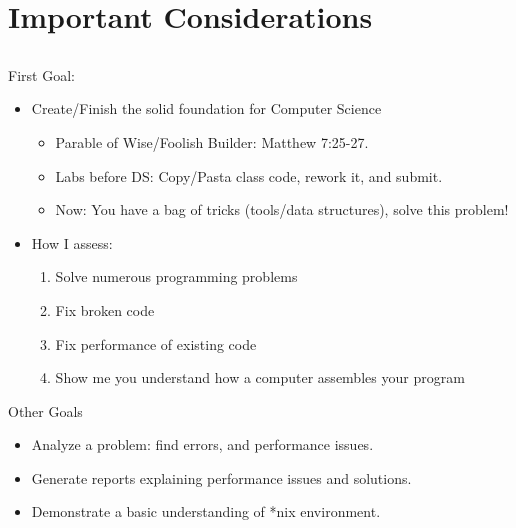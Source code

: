 \documentclass{beamer}
\begin{document}
\section{Important Considerations}
\subsection{}
\begin{frame}{First Goal:}
\begin{itemize}
\item Create/Finish the solid foundation for Computer Science
\begin{itemize}
\item Parable of Wise/Foolish Builder: Matthew 7:25-27.
\item Labs before DS: Copy/Pasta class code, rework it, and submit.
\item Now: You have a bag of tricks (tools/data structures), solve this problem!
\end{itemize}
\item How I assess:
\begin{enumerate}
\item Solve numerous programming problems
\item Fix broken code
\item Fix performance of existing code
\item Show me you understand how a computer assembles your program
\end{enumerate}
\end{itemize}
\end{frame}

\begin{frame}{Other Goals}
\begin{itemize}
\item Analyze a problem: find errors, and performance issues.
\item Generate reports explaining performance issues and solutions.
\item Demonstrate a basic understanding of *nix environment.
\end{itemize}
\end{frame}
\end{document}
